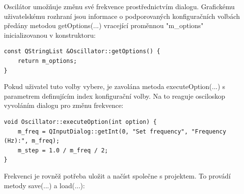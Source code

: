 Oscilátor umožňuje změnu své frekvence prostřednictvím dialogu. Grafickému uživatelskému rozhraní jsou informace o podporovaných konfiguračních volbách předány metodou getOptions(...) vracející proměnnou "m\_options" inicializovanou v konstruktoru:

\begin{lstlisting}
const QStringList &Oscillator::getOptions() {
	return m_options;
}
\end{lstlisting}

Pokud uživatel tuto volby vybere, je zavolána metoda executeOption(...) s parametrem definujícím index konfigurační volby. Na to reaguje osciloskop vyvoláním dialogu pro změnu frekvence:

\begin{lstlisting}
void Oscillator::executeOption(int option) {
	m_freq = QInputDialog::getInt(0, "Set frequency", "Frequency (Hz):", m_freq);
	m_step = 1.0 / m_freq / 2;
}
\end{lstlisting}

Frekvenci je rovněž potřeba uložit a načíst společne s projektem. To provádí metody save(...) a load(...):

